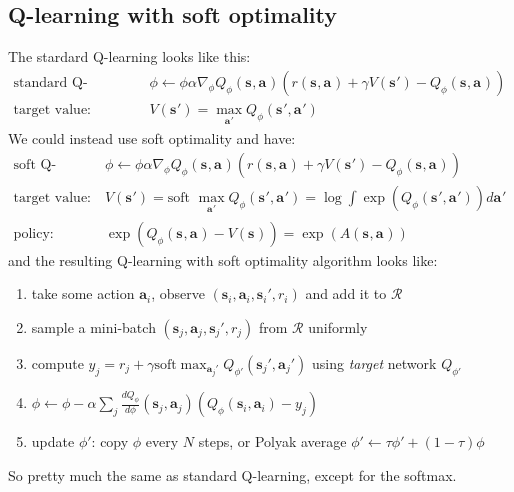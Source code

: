 \documentclass{report}
\begin{document}
\subsection{Q-learning with soft optimality}
The stardard Q-learning looks like this:
\begin{align}
\text{standard Q-learning: }& \phi \leftarrow \phi \alpha \nabla_{ \phi } Q_{ \phi } (\bm{s}_{}, \bm{a}_{} )
\left( r (\bm{s}_{}, \bm{a}_{} ) + \gamma V (\bm{s}_{}') - Q_{ \phi } (\bm{s}_{}, \bm{a}_{} ) \right)  \\
\text{target value: } & V (\bm{s}_{}') = \max_{\bm{a}_{}'} Q_{ \phi } (\bm{s}_{}', \bm{a}_{} ')
\end{align}
We could instead use soft optimality and have:
\begin{align}
\text{soft Q-learning: }& \phi \leftarrow \phi \alpha \nabla_{ \phi } Q_{ \phi } (\bm{s}_{}, \bm{a}_{} )
\left( r (\bm{s}_{}, \bm{a}_{} ) + \gamma V (\bm{s}_{}') - Q_{ \phi } (\bm{s}_{}, \bm{a}_{} ) \right)  \\
\text{target value: }& V (\bm{s}_{}') =\text{soft } \max_{\bm{a}_{}'} Q_{ \phi } (\bm{s}_{}', \bm{a}_{} ') = \log \int \exp (Q_{ \phi }(\bm{s}_{}', \bm{a}_{}' )) d\bm{a}_{}'\\
\text{policy: } & \exp (Q_{ \phi }(\bm{s}_{}, \bm{a}_{} ) - V (\bm{s}_{})) = \exp (A(\bm{s}_{}, \bm{a}_{} ))
\end{align}
and the resulting Q-learning with soft optimality algorithm looks like:
\begin{enumerate}
		\item take some action $\bm{a}_i$,  observe $\left( \bm{s}_i, \bm{a}_i, \bm{s}_i', r_i \right)$ and add it to $\mathcal{R}$
		\item sample a mini-batch  $\left( \bm{s}_j, \bm{a}_j, \bm{s}_j', r_j \right)$  from $\mathcal{R}$ uniformly
		\item compute $y_j = r_j + \gamma \text{soft} \max_{\bm{a}_j'} Q_{\phi'} (\bm{s}_{j}', \bm{a}_{j}')$ using \textit{target} network $Q_{\phi'}$
		\item $  \phi \leftarrow \phi  - \alpha \sum_{j}^{}  \frac{d Q_\phi}{d\phi} (\bm{s}_{j}, \bm{a}_{j}) \left( Q_\phi(\bm{s}_{i}, \bm{a}_{i}) - 
				y_j 	\right) $ 
		\item update $\phi'$: copy $\phi$ every $N$ steps, or Polyak average $ \phi' \leftarrow \tau \phi' + (1 - \tau) \phi  $
\end{enumerate}
So pretty much the same as standard Q-learning, except for the softmax.
\end{document}
